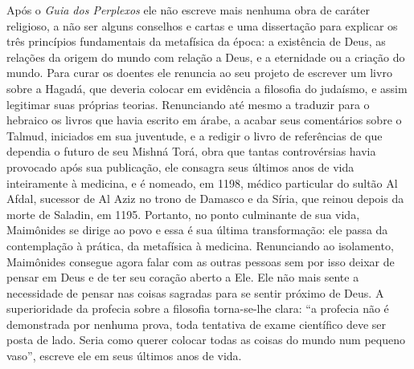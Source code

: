 Após o \emph{Guia dos Perplexos} ele não escreve mais nenhuma obra de
caráter religioso, a não ser alguns conselhos e cartas e uma dissertação
para explicar os três princípios fundamentais da metafísica da época: a
existência de Deus, as relações da origem do mundo com relação a Deus, e
a eternidade ou a criação do mundo. Para curar os doentes ele renuncia
ao seu projeto de escrever um livro sobre a Hagadá, que deveria colocar
em evidência a filosofia do judaísmo, e assim legitimar suas próprias
teorias. Renunciando até mesmo a traduzir para o hebraico os livros que
havia escrito em árabe, a acabar seus comentários sobre o Talmud,
iniciados em sua juventude, e a redigir o livro de referências de que
dependia o futuro de seu Mishná Torá, obra que tantas
controvérsias havia provocado após sua publicação, ele consagra seus
últimos anos de vida inteiramente à medicina, e é nomeado, em 1198,
médico particular do sultão Al Afdal, sucessor de Al Aziz no trono de
Damasco e da Síria, que reinou depois da morte de Saladin, em 1195.
Portanto, no ponto culminante de sua vida, Maimônides se dirige ao povo
e essa é sua última transformação: ele passa da contemplação à prática,
da metafísica à medicina. Renunciando ao isolamento, Maimônides
consegue agora falar com as outras pessoas sem por isso deixar de pensar
em Deus e de ter seu coração aberto a Ele. Ele não mais sente a
necessidade de pensar nas coisas sagradas para se sentir próximo de
Deus. A superioridade da profecia sobre a filosofia torna-se-lhe clara:
``a profecia não é demonstrada por nenhuma prova, toda tentativa de
exame científico deve ser posta de lado. Seria como querer colocar
todas as coisas do mundo num pequeno vaso'', escreve ele em seus últimos
anos de vida.

